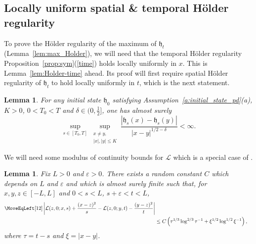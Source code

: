 \documentclass[oneside,final,11pt]{amsart}
\newtheorem{lem}[thm]{Lemma}
\newtheorem{lemma}[thm]{Lemma}
\theoremstyle{definition}
\newcommand{\fh}{\mathfrak{h}}
\newcommand{\CC}{\mathcal{C}}
\newcommand{\SR}{\mathscr{R}}
\newcommand{\1}[1]{\mathbf{1}_{#1}}
\newcommand{\mc}{\mathcal}
\numberwithin{equation}{section}
\begin{document}

\subsection{Locally uniform spatial \& temporal H\"{o}lder regularity}

To prove the H\"older regularity of the maximum of $\fh_t$ (Lemma~\ref{lem:max_Holder}), we will need that the temporal H\"{o}lder regularity Proposition~\ref{prop:sym}(\ref{time}) holds locally uniformly in $x$. This is Lemma~\ref{lem:Holder-time} ahead. Its proof will first require spatial H\"older regularity of $\fh_t$ to hold locally uniformly in $t$, which is the next statement.


\begin{lem}\label{lem:Holder-space}
For any initial state $\fh_0$ satisfying Assumption~\ref{a:initial_state_pd}(a), $K>0$, $0 < T_0 < T$ and  $\delta\in (0,\tfrac12]$, one has almost surely
\begin{equation}
  \sup_{s \in [T_0, T]} \sup_{\substack{x\neq y,\\|x|,|y|\leq K}} \frac{|\fh_s(x) - \fh_s(y)|}{|x - y|^{1/2-\delta}} < \infty.
\end{equation}
\end{lem}

We will need some modulus of continuity bounds for $\mc L$ which is a special case of \cite[Proposition~10.5]{Landscape}. %

\begin{lemma}\label{l.landscape mod of con}%
Fix $L>0$ and $\varepsilon>0$. There exists a random constant $C$ which depends on $L$ and $\varepsilon$ and which is almost surely finite such that, for $x,y,z\in[-L,L]$ and $0<s<L$, $s+\varepsilon<t<L$,
%
\begin{align*}
\MoveEqLeft[12]
\left|\mc L(z,0;x,s)+\frac{(x-z)^2}{s} - \mc L(z,0;y,t)-\frac{(y-z)^2}{t}\right|\\
%
&\leq C\left(\tau^{1/3}\log^{2/3}\tau^{-1}+ \xi^{1/2}\log^{1/2}\xi^{-1}\right),
\end{align*}
%
where $\tau=t-s$ and $\xi=|x-y|$.
\end{lemma}
\end{document}
